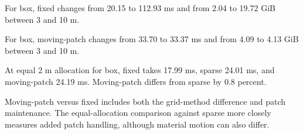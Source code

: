 For box, fixed changes from 20.15 to 112.93 ms and from 2.04 to 19.72 GiB between 3 and 10 m.

For box, moving-patch changes from 33.70 to 33.37 ms and from 4.09 to 4.13 GiB between 3 and 10 m.

At equal 2 m allocation for box, fixed takes 17.99 ms, sparse 24.01 ms, and moving-patch 24.19 ms. Moving-patch differs from sparse by 0.8 percent.

Moving-patch versus fixed includes both the grid-method difference and patch maintenance. The equal-allocation comparison against sparse more closely measures added patch handling, although material motion can also differ.
